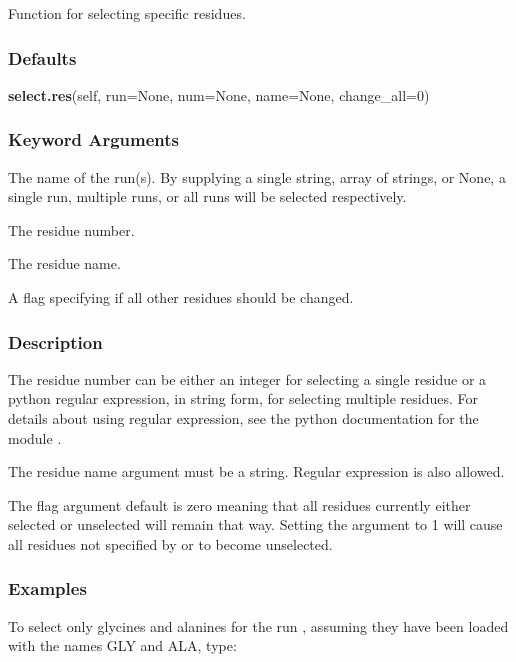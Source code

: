 Function for selecting specific residues.



\subsubsection{Defaults}

\textsf{\textbf{select.res}(self, run=None, num=None, name=None, change\_all=0)}


\subsubsection{Keyword Arguments}

  The name of the run(s).  By supplying a single string, array of strings, or None, a single run, multiple runs, or all runs will be selected respectively. 

  The residue number. 

  The residue name. 

  A flag specifying if all other residues should be changed. 




\subsubsection{Description}

The residue number can be either an integer for selecting a single residue or a python regular expression, in string form, for selecting multiple residues.  For details about using regular expression, see the python documentation for the module .


The residue name argument must be a string.  Regular expression is also allowed.


The  flag argument default is zero meaning that all residues currently either selected or unselected will remain that way.  Setting the argument to 1 will cause all residues not specified by  or  to become unselected.



\subsubsection{Examples}

To select only glycines and alanines for the run , assuming they have been loaded with the names GLY and ALA, type:


